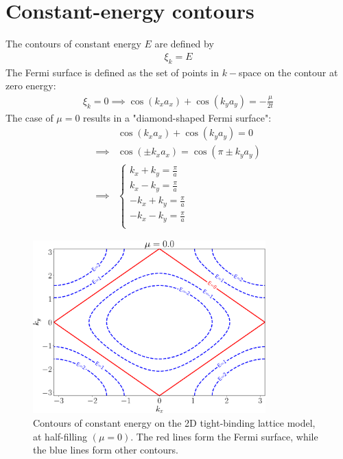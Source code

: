 \documentclass[12pt]{article}
\numberwithin{equation}{section}
\begin{document}
\section*{Constant-energy contours}
The contours of constant energy \(E\) are defined by
\begin{equation}\begin{aligned}
	\xi_k = E
\end{aligned}\end{equation}
The Fermi surface is defined as the set of points in $k-$space on the contour at zero energy:
\begin{equation}\begin{aligned}
	\xi_k = 0 \implies \cos(k_x a_x) + \cos(k_y a_y) = -\frac{\mu}{2t}
\end{aligned}\end{equation}
The case of \(\mu=0\) results in a "diamond-shaped Fermi surface":
\begin{equation}\begin{aligned}
	&\cos(k_x a_x) + \cos(k_y a_y) = 0\\
	\implies &\cos(\pm k_x a_x) = \cos(\pi \pm k_y a_y) \\
	\implies & \begin{cases}
		k_x + k_y = \frac{\pi}{a}\\
		k_x - k_y = \frac{\pi}{a}\\
		-k_x + k_y = \frac{\pi}{a}\\
		-k_x - k_y = \frac{\pi}{a}\\
	\end{cases}
\end{aligned}\end{equation}
\begin{figure}[htpb]
	\centering
	\includegraphics[width=0.8\textwidth]{./contours.pdf}
	\caption{Contours of constant energy on the 2D tight-binding lattice model, at half-filling \((\mu = 0)\). The red lines form the Fermi surface, while the blue lines form other contours.}
\end{figure}
\end{document}
